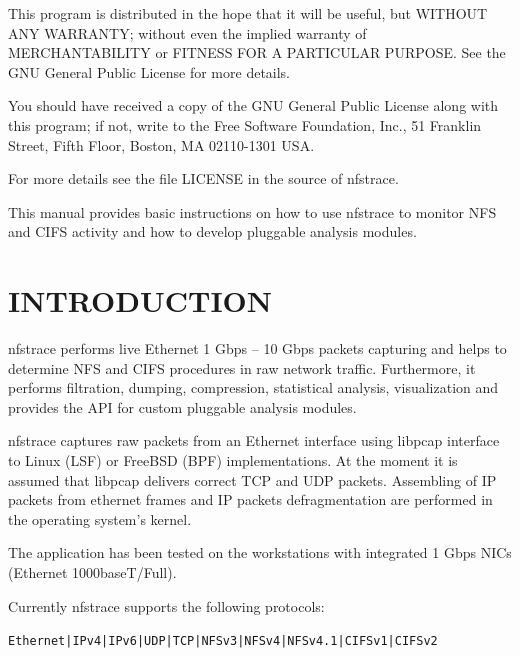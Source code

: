 \documentclass[oneside]{article}
\newcommand{\gls}{}
\newcommand*{\textfile}[1]{\textsf{#1}}
\newcommand*{\textprog}[1]{\textfile{#1}}
\begin{document}
\vspace{5mm} This program is distributed in the hope that it will be useful,
but WITHOUT ANY WARRANTY; without even the implied warranty of MERCHANTABILITY
or FITNESS FOR A PARTICULAR PURPOSE. See the GNU General Public License for
more details.

\vspace{5mm} You should have received a copy of the GNU General Public License
along with this program; if not, write to the Free Software Foundation, Inc.,
51 Franklin Street, Fifth Floor, Boston, MA 02110-1301 USA.

\vspace{5mm} For more details see the file LICENSE in the source of nfstrace.

\vspace{5mm} This manual provides basic instructions on how to use \textprog{nfstrace} to
monitor \gls{NFS} and \gls{CIFS} activity and how to develop pluggable analysis
modules.

\newpage 

\tableofcontents

\newpage

\section{INTRODUCTION}

\textprog{nfstrace} performs live Ethernet 1 Gbps – 10 Gbps packets capturing and helps to
determine \gls{NFS} and \gls{CIFS} procedures in raw network traffic.
Furthermore, it performs filtration, dumping, compression, statistical
analysis, visualization and provides the API for custom pluggable analysis
modules. 

\textprog{nfstrace} captures raw packets from an Ethernet interface using libpcap
interface to Linux (\gls{LSF}) or FreeBSD (\gls{BPF}) implementations. At the
moment it is assumed that libpcap delivers correct TCP and UDP packets.
Assembling of IP packets from ethernet frames and IP packets defragmentation
are performed in the operating system's kernel.

The application has been tested on the workstations with integrated 1 Gbps
\gls{NIC}s (Ethernet 1000baseT/Full).

Currently \textprog{nfstrace} supports the following protocols:
\begin{alltt}
Ethernet | IPv4 | IPv6 | UDP | TCP |  NFSv3 | NFSv4 | NFSv4.1 | CIFSv1 | CIFSv2
\end{alltt}
\end{document}
